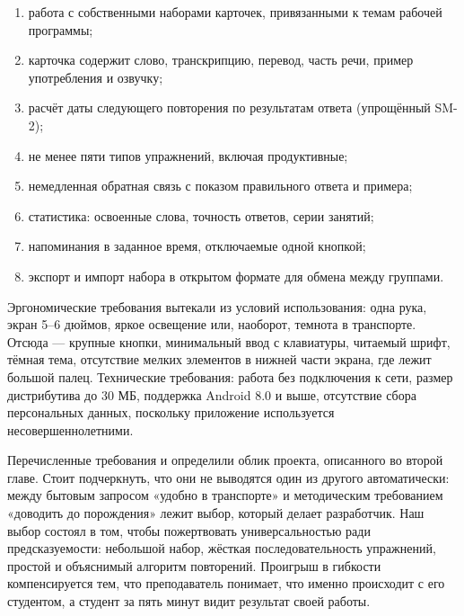 \documentclass[11pt,a4paper,openany]{report}
\begin{document}
\begin{enumerate}

  \item работа с собственными наборами карточек, привязанными к темам рабочей программы;

  \item карточка содержит слово, транскрипцию, перевод, часть речи, пример употребления и озвучку;

  \item расчёт даты следующего повторения по результатам ответа (упрощённый SM-2);

  \item не менее пяти типов упражнений, включая продуктивные;

  \item немедленная обратная связь с показом правильного ответа и примера;

  \item статистика: освоенные слова, точность ответов, серии занятий;

  \item напоминания в заданное время, отключаемые одной кнопкой;

  \item экспорт и импорт набора в открытом формате для обмена между группами.

\end{enumerate}

Эргономические требования вытекали из условий использования: одна рука, экран 5–6 дюймов, яркое освещение или, наоборот, темнота в транспорте. Отсюда — крупные кнопки, минимальный ввод с клавиатуры, читаемый шрифт, тёмная тема, отсутствие мелких элементов в нижней части экрана, где лежит большой палец. Технические требования: работа без подключения к сети, размер дистрибутива до 30 МБ, поддержка Android 8.0 и выше, отсутствие сбора персональных данных, поскольку приложение используется несовершеннолетними.

Перечисленные требования и определили облик проекта, описанного во второй главе. Стоит подчеркнуть, что они не выводятся один из другого автоматически: между бытовым запросом «удобно в транспорте» и методическим требованием «доводить до порождения» лежит выбор, который делает разработчик. Наш выбор состоял в том, чтобы пожертвовать универсальностью ради предсказуемости: небольшой набор, жёсткая последовательность упражнений, простой и объяснимый алгоритм повторений. Проигрыш в гибкости компенсируется тем, что преподаватель понимает, что именно происходит с его студентом, а студент за пять минут видит результат своей работы.
\end{document}
